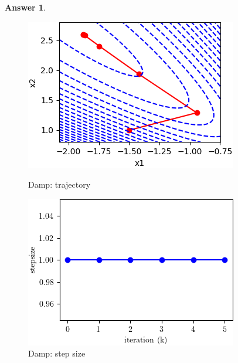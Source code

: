 \documentclass{article}
\theoremstyle{definition}
\newtheorem{ans}{Answer}
\begin{document}
\begin{ans}
\begin{enumerate}[(a)]
			\begin{figure}[h]
				\begin{minipage}[t]{0.33\linewidth}
					\centering
					\includegraphics[width=1\linewidth]{../figures/1b/dnt_traces0}
					\caption{Damp: trajectory}
					\label{p13}
				\end{minipage}
				\begin{minipage}[t]{0.33\linewidth}
					\centering
					\includegraphics[width=1\linewidth]{../figures/1b/dnt_ss0}
					\caption{Damp: step size}
					\label{p14}
				\end{minipage}
				\begin{minipage}[t]{0.33\linewidth}
					\centering

\end{minipage}
\end{figure}
\end{enumerate}
\end{ans}
\end{document}

